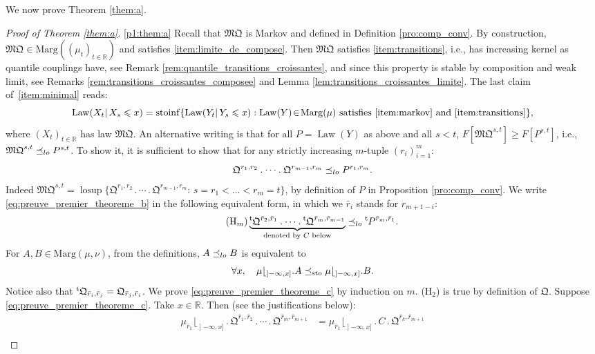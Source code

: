 \documentclass[11pt]{article}
\newcommand{\ie}{i.e.,\xspace}
\newcommand{\skpt}{\smallskip}
\newcommand{\ldot}{\mathbin{.}}
\newcommand{\lcdots}{\ldot\cdots\ldot}
\theoremstyle{plain}
\theoremstyle{definition}
\newcommand{\como}{\mathfrak{Q}}
\newcommand{\mq}{\mathfrak{MQ}}
\newcommand{\trans}{{}^{\mathrm{t}}\mkern-1mu}
\newcommand{\ma}{\mathrm{Marg}}
\newcommand{\R}{\mathbb{R}}
\newcommand{\law}{\operatorname{Law}}
\newcommand{\lcsup}{\operatorname{losup}}
\newcommand{\leqs}{\preceq_{\text{\rm sto}}}
\newcommand{\op}{\mathopen}
\newcommand{\leqlc}{\preceq_{\rm lo}}
\begin{document}
We now prove Theorem \ref{them:a}.

\skpt
\begin{proof}[Proof of Theorem \ref{them:a}]

\eqref{p1:them:a}
Recall that $\mq$ is Markov and defined in Definition \ref{pro:comp_conv}. By construction, $\mq\in\ma((\mu_t)_{t\in\R})$ and satisfies \eqref{item:limite_de_compose}. Then $\mq$ satisfies \eqref{item:transitions}, \ie has increasing kernel as quantile couplings have, see Remark \ref{rem:quantile_transitions_croissantes}, and since this property is stable by composition and weak limit, see Remarks \ref{rem:transitions_croissantes_composee} and Lemma \ref{lem:transitions_croissantes_limite}. The last claim of~\eqref{item:minimal} reads:
\[
\law(X_{t}|\,X_{s}\leqslant x)
=\mathrm{stoinf}\{\law(Y_{t}|\,Y_{s}\leqslant x):\law(Y)\!\in\!\ma(\mu)\ \text{satisfies \eqref{item:markov} and \eqref{item:transitions}}\},
\]
where $(X_t)_{t\in \R}$ has law $\mq$. An alternative writing is that for all $P=\law(Y)$ as above and all $s<t$, $F[\mq^{s,t}]\geqslant F[P^{s,t}]$, \ie $\mq^{s,t}\leqlc P^{s,t}$. To show it, it is sufficient to show that for any strictly increasing $m$-tuple $(r_i)_{i=1}^m$:
\begin{equation}\label{eq:preuve_premier_theoreme_b}
\como^{r_1,r_2}\lcdots \como^{r_{m-1},r_m}\leqlc P^{r_1,r_m}.
\end{equation}
Indeed $\mq^{s,t}=\lcsup \{\como^{r_1,r_2}\lcdots \como^{r_{m-1},r_m}:\,s= r_1<\ldots<r_m= t\}$, by definition of $P$ in Proposition \ref{pro:comp_conv}.
We write \eqref{eq:preuve_premier_theoreme_b} in the following equivalent form, in which we $\bar r_i$ stands for $r_{m+1-i}$:
\begin{equation}\tag{H$_m$}\label{eq:preuve_premier_theoreme_c}
\underbrace{\trans\como^{\bar r_2,\bar r_1}\lcdots \trans\como^{\bar r_{m},\bar r_{m-1}}}_{\text{denoted by $C$ below}}\leqlc \trans P^{\bar r_m,\bar r_1}.
\end{equation}
For $A,B\in\ma(\mu,\nu)$, from the definitions, $A\leqlc B$ is equivalent to
\[
\forall x,\quad\mu\lfloor_{\op]-\infty,x]}\ldot A\leqs\mu\lfloor_{\op]-\infty,x]}\ldot B.
\]
Notice also that $\trans\como_{\bar r_i,\bar r_j}=\como_{\bar r_j,\bar r_i}$. We prove \eqref{eq:preuve_premier_theoreme_c} by induction on $m$. (H$_2$) is true by definition of $\como$. Suppose \eqref{eq:preuve_premier_theoreme_c}. Take $x\in\R$. Then (see the justifications below):
\begin{align}
\mu_{\bar r_1}\lfloor_{\op]-\infty,x]}{}\ldot\como^{\bar r_1,\bar r_2}\lcdots \como^{\bar r_{m},\bar r_{m+1}}&=\mu_{\bar r_1}\lfloor_{\op]-\infty,x]}\ldot C\ldot\como^{\bar r_{k},\bar r_{m+1}}\nonumber\\

\end{align}
\end{proof}
\end{document}
